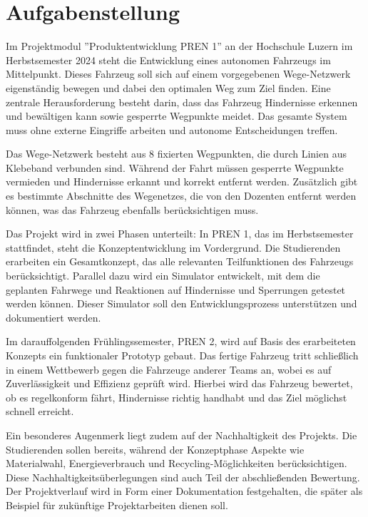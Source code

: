\newpage
\section{Aufgabenstellung}
Im Projektmodul ''Produktentwicklung PREN 1'' an der Hochschule Luzern im Herbstsemester 2024 steht die Entwicklung eines autonomen Fahrzeugs im Mittelpunkt. Dieses Fahrzeug soll sich auf einem vorgegebenen Wege-Netzwerk eigenständig bewegen und dabei den optimalen Weg zum Ziel finden. Eine zentrale Herausforderung besteht darin, dass das Fahrzeug Hindernisse erkennen und bewältigen kann sowie gesperrte Wegpunkte meidet. Das gesamte System muss ohne externe Eingriffe arbeiten und autonome Entscheidungen treffen. 

Das Wege-Netzwerk besteht aus 8 fixierten Wegpunkten, die durch Linien aus Klebeband verbunden sind. Während der Fahrt müssen gesperrte Wegpunkte vermieden und Hindernisse erkannt und korrekt entfernt werden. Zusätzlich gibt es bestimmte Abschnitte des Wegenetzes, die von den Dozenten entfernt werden können, was das Fahrzeug ebenfalls berücksichtigen muss. 

Das Projekt wird in zwei Phasen unterteilt: In PREN 1, das im Herbstsemester stattfindet, steht die Konzeptentwicklung im Vordergrund. Die Studierenden erarbeiten ein Gesamtkonzept, das alle relevanten Teilfunktionen des Fahrzeugs berücksichtigt. Parallel dazu wird ein Simulator entwickelt, mit dem die geplanten Fahrwege und Reaktionen auf Hindernisse und Sperrungen getestet werden können. Dieser Simulator soll den Entwicklungsprozess unterstützen und dokumentiert werden. 

Im darauffolgenden Frühlingssemester, PREN 2, wird auf Basis des erarbeiteten Konzepts ein funktionaler Prototyp gebaut. Das fertige Fahrzeug tritt schließlich in einem Wettbewerb gegen die Fahrzeuge anderer Teams an, wobei es auf Zuverlässigkeit und Effizienz geprüft wird. Hierbei wird das Fahrzeug bewertet, ob es regelkonform fährt, Hindernisse richtig handhabt und das Ziel möglichst schnell erreicht. 

Ein besonderes Augenmerk liegt zudem auf der Nachhaltigkeit des Projekts. Die Studierenden sollen bereits, während der Konzeptphase Aspekte wie Materialwahl, Energieverbrauch und Recycling-Möglichkeiten berücksichtigen. Diese Nachhaltigkeitsüberlegungen sind auch Teil der abschließenden Bewertung. Der Projektverlauf wird in Form einer Dokumentation festgehalten, die später als Beispiel für zukünftige Projektarbeiten dienen soll.

